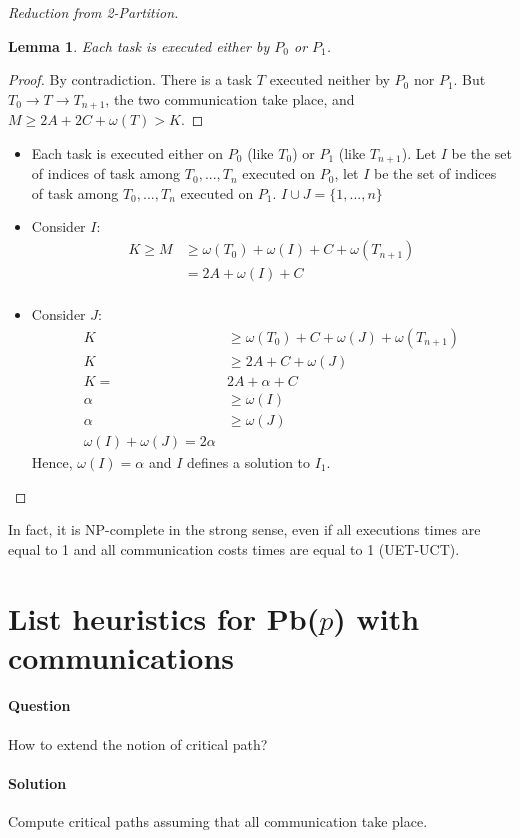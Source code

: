 \documentclass{article}
\newtheorem{lemma}{Lemma}
\begin{document}
\begin{proof}[Reduction from 2-Partition]
\begin{lemma}
Each task is executed either by $P_0$ or $P_1$.
\end{lemma}
\begin{proof}
By contradiction. There is a task $T$ executed neither by $P_0$ nor $P_1$. But $T_0 \to T \to T_{n+1}$, the two communication take place, and $M\geq 2A+2C+\omega(T)>K$.
\end{proof}

\begin{itemize}
\item Each task is executed either on $P_0$ (like $T_0$) or $P_1$ (like $T_{n+1}$). Let $I$ be the set of indices of task among $T_0,...,T_n$ executed on $P_0$, let $I$ be the set of indices of task among $T_0,...,T_n$ executed on $P_1$.
$I\cup J=\{1,...,n\}$
\item Consider $I$:
\begin{align*}
K\geq M & \geq \omega(T_0) + \omega(I)+C+\omega(T_{n+1})\\
& = 2A + \omega(I)+C\\
\end{align*}

\item Consider $J$:
\begin{align*}
K & \geq \omega(T_0) + C + \omega(J) + \omega(T_{n+1})\\
K & \geq 2A + C + \omega (J)\\
K= & 2A+\alpha+C\\
\alpha & \geq \omega(I)\\
\alpha & \geq \omega(J)\\
\omega(I)+\omega(J)=2\alpha
\end{align*}
Hence, $\omega(I)=\alpha$ and $I$ defines a solution to $I_1$.
\end{itemize}
\end{proof}

In fact, it is NP-complete in the strong sense, even if all executions times are equal to 1 and all communication costs times are equal to 1 (UET-UCT).

\section{List heuristics for Pb($p$) with communications}
\paragraph{Question}
How to extend the notion of critical path?
\paragraph{Solution}
Compute critical paths assuming that all communication take place.
\end{document}
